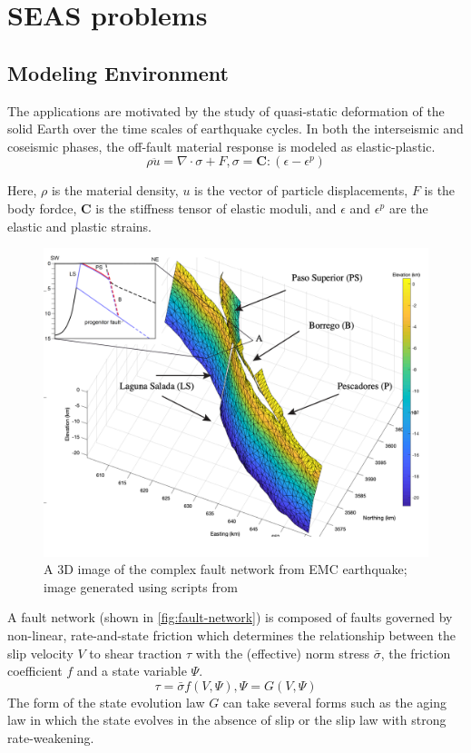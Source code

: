 \section{SEAS problems}
\subsection{Modeling Environment}
The applications are motivated by the study of quasi-static deformation of the solid Earth over the time scales of earthquake cycles.
In both the interseismic and coseismic phases, the off-fault material response is modeled as elastic-plastic.
\begin{equation}\label{eqn:governing}
    \rho \ddot{u} = \nabla \cdot \sigma + F, \sigma = \boldsymbol{C} : (\epsilon - \epsilon^p) 
\end{equation}

Here, $\rho$ is the material density, $u$ is the vector of particle displacements, $F$ is the body fordce, $\boldsymbol{C}$ is the stiffness tensor of elastic moduli, and $\epsilon$ and $\epsilon^p$ are the elastic and plastic strains.
\begin{figure}
    \centering
    \includegraphics[width=\linewidth]{figures/fault-network.png}
    \caption{A 3D image of the complex fault network from EMC earthquake; image generated using scripts from \cite{https://doi.org/10.1002/2016GL072289}}
    \label{fig:fault-network}
\end{figure}
A fault network (shown in \autoref{fig:fault-network}) is composed of faults governed by non-linear, rate-and-state friction which determines the relationship between the slip velocity $V$ to shear traction $\tau$ with the (effective) norm stress $\bar{\sigma}$, the friction coefficient $f$ and a state variable $\Psi$.
\begin{equation}\label{eqn:friction-law}
    \tau = \bar{\sigma} f(V,\Psi), \Psi = G(V, \Psi)
\end{equation}
The form of the state evolution law $G$ can take several forms such as the aging law in which the state evolves in the absence of slip or the slip law with strong rate-weakening.

